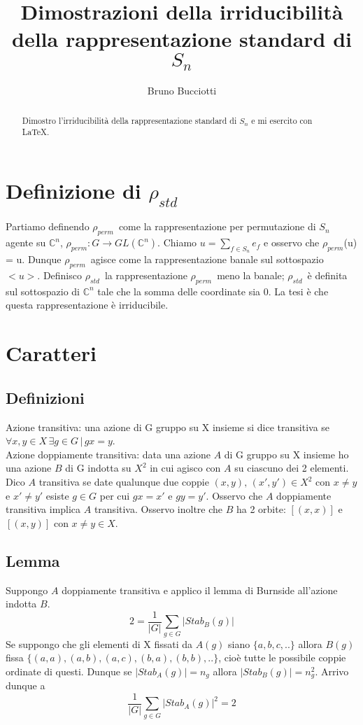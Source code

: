 \documentclass[]{article}
\title{Dimostrazioni della irriducibilità della rappresentazione standard di $S_n$}
\author{Bruno Bucciotti}
\def\ros{$\rho_{std}$}
\def\rop{$\rho_{perm}$}
\def\Cn{\ensuremath{\mathbb{C}}^n}
\begin{document}
\maketitle

\begin{abstract}
Dimostro l'irriducibilità della rappresentazione standard di $S_n$ e mi esercito con \LaTeX.
\end{abstract}

\section*{Definizione di \ros}
Partiamo definendo \rop\, come la rappresentazione per permutazione di $S_n$ agente su $\Cn$, \rop $: G \rightarrow GL(\Cn)$. Chiamo $u = \sum_{f\in S_n} e_f$ e osservo che \rop(u) = u. Dunque \rop\, agisce come la rappresentazione banale sul sottospazio $<u>$. Definisco \ros\, la rappresentazione \rop\, meno la banale; \ros\, è definita sul sottospazio di $\Cn$ tale che la somma delle coordinate sia 0. La tesi è che questa rappresentazione è irriducibile.

\section{Caratteri}
\subsection{Definizioni}
Azione transitiva: una azione di G gruppo su X insieme si dice transitiva se $\forall x, y \in X\, \exists g\in G\,|\, gx = y$.\\
Azione doppiamente transitiva: data una azione $A$ di G gruppo su X insieme ho una azione $B$ di G indotta su $X^2$ in cui agisco con $A$ su ciascuno dei 2 elementi. Dico $A$ transitiva se date qualunque due coppie $(x,y),\,(x',y')\in X^2$ con $x\neq y$ e $x'\neq y'$	esiste $g\in G$ per cui $gx=x'$ e $gy=y'$. Osservo che $A$ doppiamente transitiva implica $A$ transitiva. Osservo inoltre che $B$ ha 2 orbite: $[(x,x)]$ e $[(x,y)]$ con $x\neq y \in X$.
\subsection{Lemma}
Suppongo $A$ doppiamente transitiva e applico il lemma di Burnside all'azione indotta $B$.
\[2 = \dfrac{1}{|G|} \sum_{g\in G} |Stab_B(g)|\]
Se suppongo che gli elementi di X fissati da $A(g)$ siano $\{a, b, c, ..\}$ allora $B(g)$ fissa $\{(a,a), (a,b), (a,c), (b,a), (b,b),..\}$, cioè tutte le possibile coppie ordinate di questi. Dunque se $|Stab_A(g)| = n_g$ allora $|Stab_B(g)| = n_g ^2$. Arrivo dunque a
\[\dfrac{1}{|G|} \sum_{g\in G} |Stab_A(g)|^2 = 2\]
\end{document}
